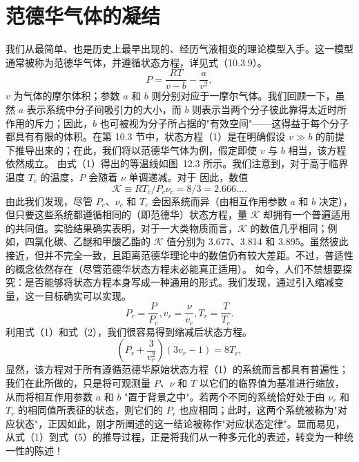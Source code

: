 \section{范德华气体的凝结}\label{ux8303ux5fb7ux534eux6c14ux4f53ux7684ux51ddux7ed3}
我们从最简单、也是历史上最早出现的、经历气液相变的理论模型入手。这一模型通常被称为范德华气体，并遵循状态方程，详见式（10.3.9）。
\begin{equation}\tag{12.2.1}\label{eq:12.2.1}
P = \frac { R T } { v - b } - \frac { a } { v ^{2} } ,
\end{equation}
\(v\) 为气体的摩尔体积；参数 \(a\) 和 \(b\) 则分别对应于一摩尔气体。我们回顾一下，虽然 \(a\) 表示系统中分子间吸引力的大小，而 \(b\) 则表示当两个分子彼此靠得太近时所作用的斥力；因此，\(b\) 也可被视为分子所占据的"有效空间"——这得益于每个分子都具有有限的体积。在第 10.3 节中，状态方程（1）是在明确假设 \(v \gg b\) 的前提下推导出来的；在此，我们将以范德华气体为例，假定即使 \(v\) 与 \(b\) 相当，该方程依然成立。
由式（1）得出的等温线如图~12.3 所示。我们注意到，对于高于临界温度 \(T_{c}\) 的温度，\(P\) 会随着 \(\nu\) 单调递减。对于
因此，数值
\begin{equation}\tag{12.2.2}\label{eq:12.2.2}
\mathcal { K } \equiv R T _ { c } / P _ { c } \nu _ { c } = 8 / 3 = 2 . 66 6 . . . .
\end{equation}
由此我们发现，尽管 \(P_{c}\)、\(\nu_{c}\) 和 \(T_{c}\) 会因系统而异（由相互作用参数 \(a\) 和 \(b\) 决定），但只要这些系统都遵循相同的（即范德华）状态方程，量 \(\mathcal{K}\) 却拥有一个普遍适用的共同值。实验结果确实表明，对于一大类物质而言，\(\mathcal{K}\) 的数值几乎相同；例如，四氯化碳、乙醚和甲酸乙酯的 \(\mathcal{K}\) 值分别为 3.677、3.814 和 3.895。虽然彼此接近，但并不完全一致，且距离范德华理论中的数值仍有较大差距。不过，普适性的概念依然存在（尽管范德华状态方程未必能真正适用）。
如今，人们不禁想要探究：是否能够将状态方程本身写成一种通用的形式。我们发现，通过引入缩减变量，这一目标确实可以实现。
\begin{equation}\tag{12.2.3}\label{eq:12.2.3}
P _ { r } = \frac { P } { P _ { c } } ,  v _ { r } = \frac { \nu } { v _ { c } } ,  T _ { r } = \frac { T } { T _ { c } } .
\end{equation}
利用式（1）和式（2），我们很容易得到缩减后状态方程。
\begin{equation}\tag{12.2.4}\label{eq:12.2.4}
\left( P _ { r } + \frac { 3 } { v _ { r } ^{2} } \right) ( 3 v _ { r } - 1 ) = 8 T _ { r } ,
\end{equation}
显然，该方程对于所有遵循范德华原始状态方程（1）的系统而言都具有普遍性；我们在此所做的，只是将可观测量 \(P\)、\(\nu\) 和 \(T\) 以它们的临界值为基准进行缩放，从而将相互作用参数 \(a\) 和 \(b\) "置于背景之中"。若两个不同的系统恰好处于由 \(\nu_r\) 和 \(T_r\) 的相同值所表征的状态，则它们的 \(P_r\) 也应相同；此时，这两个系统被称为"对应状态"，正因如此，刚才所阐述的这一结论被称作"对应状态定律"。显而易见，从式（1）到式（5）的推导过程，正是将我们从一种多元化的表述，转变为一种统一性的陈述！
